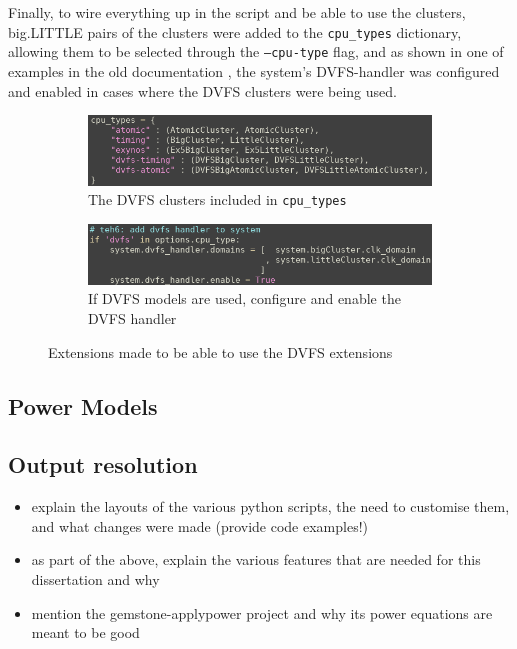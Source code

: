     Finally, to wire everything up in the script and be able to use the
    clusters, big.LITTLE pairs of the clusters were added to the 
    \texttt{cpu\_types} dictionary, allowing them to be selected through the
    \texttt{--cpu-type} flag, and as shown in one of examples in the old 
    documentation \cite{noauthor_experimenting_2019}, the system's DVFS-handler
    was configured and enabled in cases where the DVFS clusters were being used.
    \begin{figure}[H]
        \centering
        \begin{subfigure}{0.9\linewidth}
            \centering
            \includegraphics[width=\textwidth]{screenshots/config-exts/cpu-types.png}
            \caption{The DVFS clusters included in \texttt{cpu\_types}}
        \end{subfigure}
        \begin{subfigure}{0.9\linewidth}
            \centering
            \includegraphics[width=\textwidth]{screenshots/config-exts/dvfs-handler.png}
            \caption{If DVFS models are used, configure and enable the DVFS 
                     handler}
        \end{subfigure}
        \caption{Extensions made to be able to use the DVFS extensions}
    \end{figure}
    
    \subsection{Power Models}
    
    \subsection{Output resolution}



\begin{itemize}
    \item explain the layouts of the various python scripts, the need to
          customise them, and what changes were made (provide code examples!)
    \item as part of the above, explain the various features that are needed for
          this dissertation and why
    \item mention the gemstone-applypower project and why its power equations
          are meant to be good
\end{itemize}